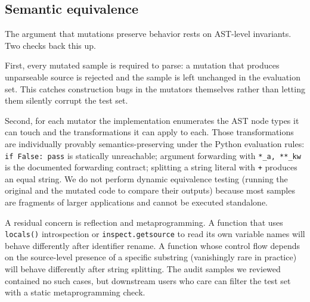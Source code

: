 \subsection{Semantic equivalence}
\label{sec:method:equivalence}

The argument that mutations preserve behavior rests on AST-level
invariants. Two checks back this up.

First, every mutated sample is required to parse: a mutation that
produces unparseable source is rejected and the sample is left
unchanged in the evaluation set. This catches construction bugs in
the mutators themselves rather than letting them silently corrupt
the test set.

Second, for each mutator the implementation enumerates the AST node
types it can touch and the transformations it can apply to each.
Those transformations are individually provably semantics-preserving
under the Python evaluation rules: \texttt{if False: pass} is
statically unreachable; argument forwarding with
\texttt{*\_a, **\_kw} is the documented forwarding contract;
splitting a string literal with \texttt{+} produces an equal string.
We do not perform dynamic equivalence testing (running the original
and the mutated code to compare their outputs) because most samples
are fragments of larger applications and cannot be executed
standalone.

A residual concern is reflection and metaprogramming. A function
that uses \texttt{locals()} introspection or
\texttt{inspect.getsource} to read its own variable names will
behave differently after identifier rename. A function whose
control flow depends on the source-level presence of a specific
substring (vanishingly rare in practice) will behave differently
after string splitting. The audit samples we reviewed contained no
such cases, but downstream users who care can filter the test set
with a static metaprogramming check.
